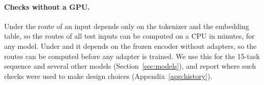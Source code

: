 \paragraph{Checks without a GPU.} Under \cert{} the route of an input depends only on the tokenizer and the
embedding table, so the routes of all test inputs can be computed on a CPU in minutes, for any model. Under \recog{} and \handicap{} it depends on the frozen encoder without adapters, so the routes can be computed before any adapter is trained.
We use this for the 15-task sequence and several other models (Section~\ref{sec:models}), and report
where such checks were used to make design choices (Appendix~\ref{app:history}).
